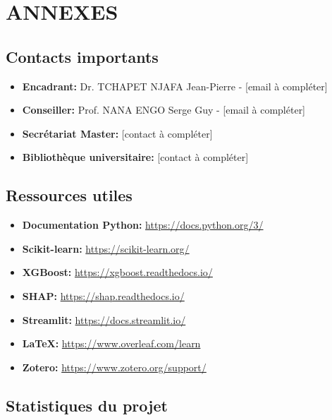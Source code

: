 \documentclass[a4paper,11pt]{article}
\begin{document}
\newpage

\section*{ANNEXES}

\subsection*{Contacts importants}

\begin{itemize}
    \item \textbf{Encadrant:} Dr. TCHAPET NJAFA Jean-Pierre - [email à compléter]
    \item \textbf{Conseiller:} Prof. NANA ENGO Serge Guy - [email à compléter]
    \item \textbf{Secrétariat Master:} [contact à compléter]
    \item \textbf{Bibliothèque universitaire:} [contact à compléter]
\end{itemize}

\subsection*{Ressources utiles}

\begin{itemize}
    \item \textbf{Documentation Python:} \url{https://docs.python.org/3/}
    \item \textbf{Scikit-learn:} \url{https://scikit-learn.org/}
    \item \textbf{XGBoost:} \url{https://xgboost.readthedocs.io/}
    \item \textbf{SHAP:} \url{https://shap.readthedocs.io/}
    \item \textbf{Streamlit:} \url{https://docs.streamlit.io/}
    \item \textbf{LaTeX:} \url{https://www.overleaf.com/learn}
    \item \textbf{Zotero:} \url{https://www.zotero.org/support/}
\end{itemize}

\subsection*{Statistiques du projet}
\end{document}
